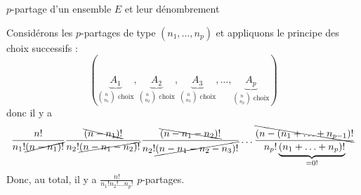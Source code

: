 \documentclass{article}
\renewenvironment{question_kholle}[2][ ]
{
	\subsection{\texorpdfstring{#2}{}}
	\notblank{#1}
	{
		\noindent #1
		\bigbreak
	}
	{}
	\begin{proof}
}
{
	\end{proof}
}
\begin{document}
\begin{question_kholle}
	[Soit $p \in \N^*$. Un $p$-partage de $E$ est un $p$-liste $(A_1, \ldots, A_p) \in \mathcal{P}(E)^p$ de parties de $E$ (éventuellement vide), deux à deux disjointes qui recouvrent $E$ c'est-à-dire \tq+* t:
		\begin{equation}
			\forall (i, j) \in \lient 1 ; p \rient,
			i \neq j \implies A_i \cap A_j = \emptyset
			\qquad \text{et} \qquad
			\bigcup_{i=1}^{p} A_i = E
		\end{equation}

		Soient $(n_1, \ldots n_p) \in \N^p$ \tqs $n = n_1 + \ldots + n_p$ est un $p$-partage de $E$ \tq
		\begin{equation*}
			\forall (i, j) \in \lient 1 ; p \rient, \
			\left|A_i\right| = n_i
		\end{equation*}
		Le nombre de $p$-partage de type $(n_1, \ldots, n_p)$ est :
		\begin{equation}
			\frac{n!}{\displaystyle \prod_{i=1}^{p} n_i !}
		\end{equation}
	]
	{$p$-partage d'un ensemble $E$ et leur dénombrement}

	Considérons les $p$-partages de type $(n_1, \ldots, n_p)$ et appliquons le principe des choix successifs :
	\begin{equation*}
		\left(
		\underbrace{A_1}_{\binom{n}{n_1} \text{ choix}},
		\underbrace{A_2}_{\binom{n}{n_2} \text{ choix}},
		\underbrace{A_3}_{\binom{n}{n_3} \text{ choix}},
		\ldots,
		\underbrace{A_p}_{\binom{n}{n_p} \text{ choix}}
		\right)
	\end{equation*}
	donc il y a
	\begin{equation*}
		\frac{ n! }{n_1! \cancel{(n-n_1)!} }
		\frac{ \bcancel{(n-n_1)!} }{n_2! \cancel{(n-n_1-n_2)!} }
		\frac{ \bcancel{(n-n_1-n_2)!} }{n_2! \cancel{(n-n_1-n_2-n_3)!} }
		\ldots
		\frac{ \bcancel{(n-(n_1+\ldots+n_{p-1})!} }{n_p! \underbrace{(n_1+\ldots+n_p)!}_{=0!} }
	\end{equation*}
	Donc, au total, il y a $\frac{n!}{n_1! n_2! \ldots n_p!}$ $p$-partages.
\end{question_kholle}
\end{document}
